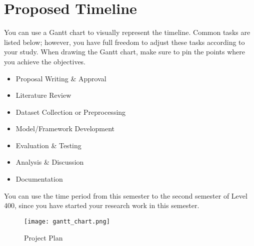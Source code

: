 \section{Proposed Timeline}

You can use a Gantt chart to visually represent the timeline. Common tasks are listed below; however, you have full freedom to adjust these tasks according to your study. When drawing the Gantt chart, make sure to pin the points where you achieve the objectives.
 
\begin{itemize}
	\item Proposal Writing \& Approval
	\item Literature Review
	\item Dataset Collection or Preprocessing
	\item Model/Framework Development
	\item Evaluation \& Testing
	\item Analysis \& Discussion
	\item Documentation	
\end{itemize}

You can use the time period from this semester to the second semester of Level 400, since you have started your research work in this semester. 

	\begin{figure}[htbp]
		\centering
		\texttt{[image: gantt\_chart.png]}
		\caption{Project Plan}
	\end{figure}
	